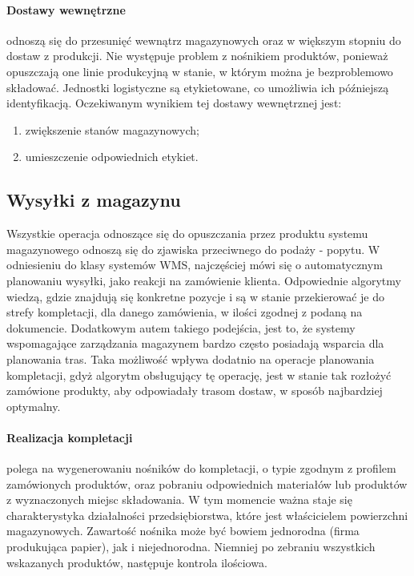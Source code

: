 			\paragraph{Dostawy wewnętrzne} odnoszą się do przesunięć wewnątrz magazynowych oraz w większym
			stopniu do dostaw z produkcji. Nie występuje problem z nośnikiem produktów, ponieważ 
			opuszczają one linie produkcyjną w stanie, w którym można je bezproblemowo składować. Jednostki
			logistyczne są etykietowane, co umożliwia ich późniejszą identyfikacją. 
			Oczekiwanym wynikiem tej dostawy wewnętrznej jest:
			\begin{enumerate}
				\item zwiększenie stanów magazynowych;
				\item umieszczenie odpowiednich etykiet.
			\end{enumerate}		 						
	\subsection{Wysyłki z magazynu}
		Wszystkie operacja odnoszące się do opuszczania przez produktu systemu magazynowego odnoszą się do zjawiska
		przeciwnego do podaży - popytu. W odniesieniu do klasy systemów WMS, najczęściej mówi się o automatycznym
		planowaniu wysyłki, jako reakcji na zamówienie klienta. Odpowiednie algorytmy wiedzą, gdzie znajdują
		się konkretne pozycje i są w stanie przekierować je do strefy kompletacji, dla danego zamówienia, w ilości
		zgodnej z podaną na dokumencie. Dodatkowym autem takiego podejścia, jest to, że systemy wspomagające
		zarządzania magazynem bardzo często posiadają wsparcia dla planowania tras. Taka możliwość wpływa dodatnio
		na operacje planowania kompletacji, gdyż algorytm obsługujący tę operację, jest w stanie tak rozłożyć
		zamówione produkty, aby odpowiadały trasom dostaw, w sposób najbardziej optymalny. 		
			\paragraph{Realizacja kompletacji} polega na wygenerowaniu nośników do kompletacji, o typie zgodnym z profilem
			zamówionych produktów, oraz pobraniu odpowiednich materiałów lub produktów z wyznaczonych miejsc
			składowania. W tym momencie ważna staje się charakterystyka działalności przedsiębiorstwa, które jest 
			właścicielem powierzchni magazynowych. Zawartość nośnika może być bowiem jednorodna (firma produkująca
			papier), jak i niejednorodna. Niemniej po zebraniu wszystkich wskazanych produktów, następuje kontrola
			ilościowa.			
